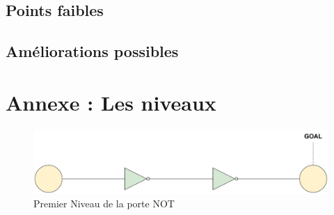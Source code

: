 \documentclass{article}
\begin{document}
	\subsection{Points faibles}
	\subsection{Améliorations possibles}

\newpage
\section{Annexe : Les niveaux}
\begin{figure}[h]
    \centering
    \includegraphics[width=\textwidth]{img/Levels-NOT-1.jpg}
    \caption{Premier Niveau de la porte NOT}
\end{figure}
\end{document}
